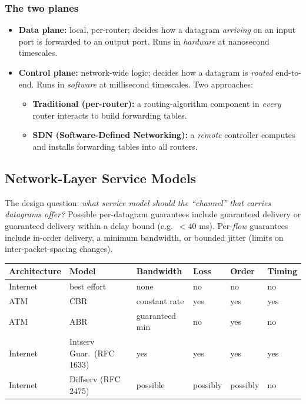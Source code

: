 \documentclass[hidelinks]{article}
\begin{document}
\subsubsection{The two planes}
\begin{itemize}
    \item \textbf{Data plane:} local, per-router; decides how a datagram
    \emph{arriving} on an input port is forwarded to an output port. Runs in
    \emph{hardware} at nanosecond timescales.
    \item \textbf{Control plane:} network-wide logic; decides how a datagram
    is \emph{routed} end-to-end. Runs in \emph{software} at millisecond
    timescales. Two approaches:
    \begin{itemize}
        \item \textbf{Traditional (per-router):} a routing-algorithm component
        in \emph{every} router interacts to build forwarding tables.
        \item \textbf{SDN (Software-Defined Networking):} a \emph{remote}
        controller computes and installs forwarding tables into all routers.
    \end{itemize}
\end{itemize}

\subsection{Network-Layer Service Models}

The design question: \emph{what service model should the ``channel'' that
carries datagrams offer?} Possible per-datagram guarantees include guaranteed
delivery or guaranteed delivery within a delay bound (e.g.\ $<40$ ms).
Per-\emph{flow} guarantees include in-order delivery, a minimum bandwidth, or
bounded jitter (limits on inter-packet-spacing changes).

\renewcommand{\arraystretch}{1.3}
\noindent\begin{tabularx}{\textwidth}{|l|l|X|X|X|X|}
\hline
\textbf{Architecture} & \textbf{Model} & \textbf{Bandwidth} & \textbf{Loss} & \textbf{Order} & \textbf{Timing} \\
\hline
Internet & best effort & none & no & no & no \\
\hline
ATM & CBR & constant rate & yes & yes & yes \\
\hline
ATM & ABR & guaranteed min & no & yes & no \\
\hline
Internet & Intserv Guar.\ (RFC 1633) & yes & yes & yes & yes \\
\hline
Internet & Diffserv (RFC 2475) & possible & possibly & possibly & no \\
\hline
\end{tabularx}
\end{document}
